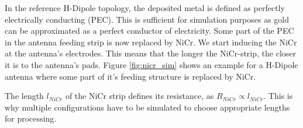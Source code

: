 In the reference H-Dipole topology, the deposited metal is defined as perfectly electrically conducting (PEC). This is sufficient for simulation purposes as gold can be approximated as a perfect conductor of electricity. Some part of the PEC in the antenna feeding strip is now replaced by NiCr. We start inducing the NiCr at the antenna's electrodes. This means that the longer the NiCr-strip, the closer it is to the antenna's pads. Figure \ref{fig:nicr_sim} shows an example for a H-Dipole antenna where some part of it's feeding structure is replaced by NiCr. 

The length $l_{NiCr}$ of the NiCr strip defines its resistance, as $R_{NiCr} \propto l_{NiCr}$. This is why multiple configurations have to be simulated to choose appropriate lengths for processing. 




